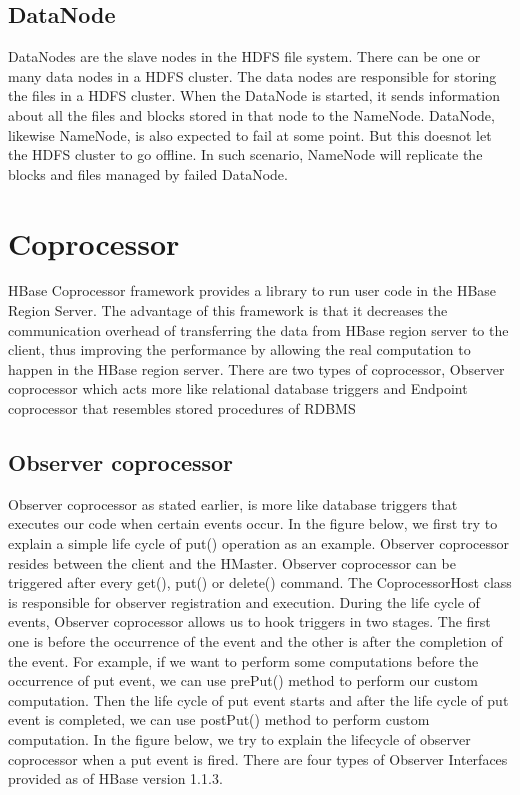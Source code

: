\documentclass[11pt,a4paper,bibtotoc,idxtotoc,headsepline,footsepline,footexclude,BCOR12mm,DIV13]{scrbook}
\begin{document}
\subsection{DataNode}
\label{DataNode}
DataNodes are the slave nodes in the HDFS file system. There can be one or many data nodes in a HDFS cluster. The data nodes are responsible for storing the files in a HDFS cluster. When the DataNode is started, it sends information about all the files and blocks stored in that node to the NameNode\cite{HDFS:datanode}. DataNode, likewise NameNode, is also expected to fail at some point. But this doesnot let the HDFS cluster to go offline. In such scenario, NameNode will replicate the blocks and files managed by failed DataNode\cite{HDFS:namenodeanddatanode}. 


\section{Coprocessor}
\label{sec:coprocessor}

HBase Coprocessor framework provides a library to run user code in the HBase Region Server. The advantage of this framework is that it decreases the communication overhead of transferring the data from HBase region server to the client, thus improving the performance by allowing the real computation to happen in the HBase region server\cite{coprocessor:coprocessor}. There are two types of coprocessor, Observer coprocessor  which acts more like relational database triggers and Endpoint coprocessor that resembles stored procedures of RDBMS\cite{coprocessor:types} 


\subsection{Observer coprocessor}
\label{sec:observercoprocessor}
Observer coprocessor as stated earlier, is more like database triggers that executes our code when certain events occur. In the figure below, we first try to explain a simple life cycle of put() operation as an example\cite{coprocessor:detail}. Observer coprocessor resides between the client and the HMaster. Observer coprocessor can be triggered after every get(), put() or delete() command. The CoprocessorHost class is responsible for observer registration and execution\cite{coprocessor:detail}.  During the life cycle of events, Observer coprocessor allows us to hook triggers in two stages. The first one is before the occurrence of the event and the other is after the completion of the event. For example, if we want to perform some computations before the occurrence of put event, we can use prePut() method to perform our custom computation. Then the life cycle of put event starts and after the life cycle of put event is completed, we can use postPut() method to perform custom computation. In the figure below, we try to explain the lifecycle of observer coprocessor when a put event is fired\cite{coprocessor:detail}.
\newline
There are four types of Observer Interfaces provided as of HBase version 1.1.3\cite{hbase:essential}.
\end{document}
